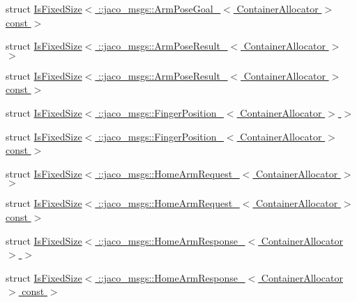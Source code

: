 \begin{DoxyCompactItemize}
\item 
struct \hyperlink{structros_1_1message__traits_1_1IsFixedSize_3_01_1_1jaco__msgs_1_1ArmPoseGoal___3_01ContainerAllocator_01_4_01const_01_01_4}{Is\+Fixed\+Size$<$ \+::jaco\+\_\+msgs\+::\+Arm\+Pose\+Goal\+\_\+$<$ Container\+Allocator $>$ const  $>$}
\item 
struct \hyperlink{structros_1_1message__traits_1_1IsFixedSize_3_01_1_1jaco__msgs_1_1ArmPoseResult___3_01ContainerAllocator_01_4_01_4}{Is\+Fixed\+Size$<$ \+::jaco\+\_\+msgs\+::\+Arm\+Pose\+Result\+\_\+$<$ Container\+Allocator $>$ $>$}
\item 
struct \hyperlink{structros_1_1message__traits_1_1IsFixedSize_3_01_1_1jaco__msgs_1_1ArmPoseResult___3_01ContainerAllocator_01_4_01const_01_01_4}{Is\+Fixed\+Size$<$ \+::jaco\+\_\+msgs\+::\+Arm\+Pose\+Result\+\_\+$<$ Container\+Allocator $>$ const  $>$}
\item 
struct \hyperlink{structros_1_1message__traits_1_1IsFixedSize_3_01_1_1jaco__msgs_1_1FingerPosition___3_01ContainerAllocator_01_4_01_4}{Is\+Fixed\+Size$<$ \+::jaco\+\_\+msgs\+::\+Finger\+Position\+\_\+$<$ Container\+Allocator $>$ $>$}
\item 
struct \hyperlink{structros_1_1message__traits_1_1IsFixedSize_3_01_1_1jaco__msgs_1_1FingerPosition___3_01ContainerAllocator_01_4_01const_01_01_4}{Is\+Fixed\+Size$<$ \+::jaco\+\_\+msgs\+::\+Finger\+Position\+\_\+$<$ Container\+Allocator $>$ const  $>$}
\item 
struct \hyperlink{structros_1_1message__traits_1_1IsFixedSize_3_01_1_1jaco__msgs_1_1HomeArmRequest___3_01ContainerAllocator_01_4_01_4}{Is\+Fixed\+Size$<$ \+::jaco\+\_\+msgs\+::\+Home\+Arm\+Request\+\_\+$<$ Container\+Allocator $>$ $>$}
\item 
struct \hyperlink{structros_1_1message__traits_1_1IsFixedSize_3_01_1_1jaco__msgs_1_1HomeArmRequest___3_01ContainerAllocator_01_4_01const_01_01_4}{Is\+Fixed\+Size$<$ \+::jaco\+\_\+msgs\+::\+Home\+Arm\+Request\+\_\+$<$ Container\+Allocator $>$ const  $>$}
\item 
struct \hyperlink{structros_1_1message__traits_1_1IsFixedSize_3_01_1_1jaco__msgs_1_1HomeArmResponse___3_01ContainerAllocator_01_4_01_4}{Is\+Fixed\+Size$<$ \+::jaco\+\_\+msgs\+::\+Home\+Arm\+Response\+\_\+$<$ Container\+Allocator $>$ $>$}
\item 
struct \hyperlink{structros_1_1message__traits_1_1IsFixedSize_3_01_1_1jaco__msgs_1_1HomeArmResponse___3_01ContainerAllocator_01_4_01const_01_01_4}{Is\+Fixed\+Size$<$ \+::jaco\+\_\+msgs\+::\+Home\+Arm\+Response\+\_\+$<$ Container\+Allocator $>$ const  $>$}

\end{DoxyCompactItemize}
